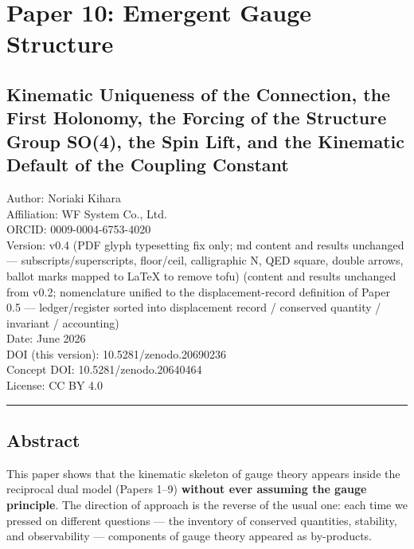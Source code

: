 \documentclass[
]{ltjsarticle}
\author{}
\date{}
\begin{document}
\section{Paper 10: Emergent Gauge
Structure}\label{paper-10-emergent-gauge-structure}

\subsection{Kinematic Uniqueness of the Connection, the First Holonomy,
the Forcing of the Structure Group SO(4), the Spin Lift, and the
Kinematic Default of the Coupling
Constant}\label{kinematic-uniqueness-of-the-connection-the-first-holonomy-the-forcing-of-the-structure-group-so4-the-spin-lift-and-the-kinematic-default-of-the-coupling-constant}

Author: Noriaki Kihara\\
Affiliation: WF System Co., Ltd.\\
ORCID: 0009-0004-6753-4020\\
Version: v0.4 (PDF glyph typesetting fix only; md content and results
unchanged --- subscripts/superscripts, floor/ceil, calligraphic N, QED
square, double arrows, ballot marks mapped to LaTeX to remove tofu)
(content and results unchanged from v0.2; nomenclature unified to the
displacement-record definition of Paper 0.5 --- ledger/register sorted
into displacement record / conserved quantity / invariant /
accounting)\\
Date: June 2026\\
DOI (this version): 10.5281/zenodo.20690236\\
Concept DOI: 10.5281/zenodo.20640464\\
License: CC BY 4.0

\begin{center}\rule{0.5\linewidth}{0.5pt}\end{center}

\subsection{Abstract}\label{abstract}

This paper shows that the kinematic skeleton of gauge theory appears
inside the reciprocal dual model (Papers 1--9) \textbf{without ever
assuming the gauge principle}. The direction of approach is the reverse
of the usual one: each time we pressed on different questions --- the
inventory of conserved quantities, stability, and observability ---
components of gauge theory appeared as by-products.
\end{document}
